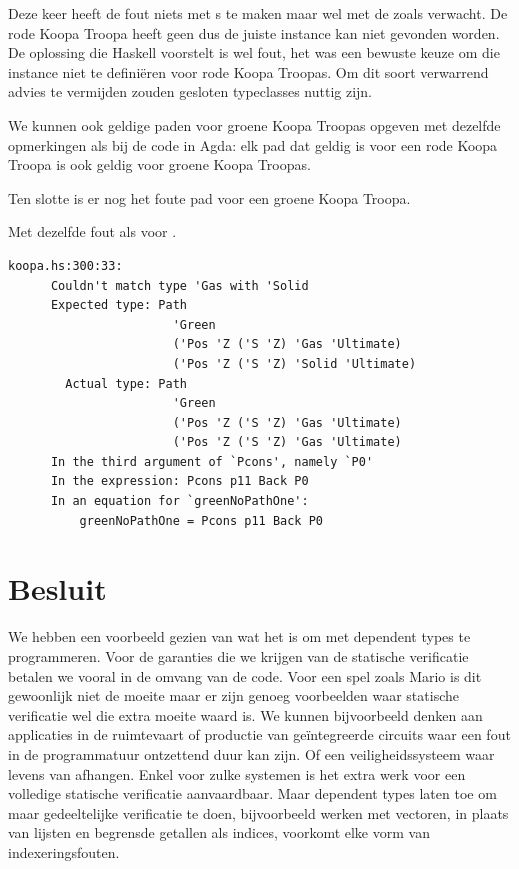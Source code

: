 Deze keer heeft de fout niets met s te maken maar wel met de
 zoals verwacht. De rode Koopa Troopa heeft geen
  dus de juiste instance kan niet gevonden worden.
De oplossing die Haskell voorstelt is wel fout, het was een bewuste keuze om
die instance niet te definiëren voor rode Koopa Troopas. Om dit soort
verwarrend advies te vermijden zouden gesloten typeclasses nuttig zijn.

We kunnen ook geldige paden voor groene Koopa Troopas opgeven met dezelfde
opmerkingen als bij de code in Agda: elk pad dat geldig is voor een rode Koopa
Troopa is ook geldig voor groene Koopa Troopas.


Ten slotte is er nog het foute pad voor een groene Koopa Troopa.


Met dezelfde fout als voor .

\begin{Verbatim}[fontsize=\small]
  koopa.hs:300:33:
      Couldn't match type 'Gas with 'Solid
      Expected type: Path
                       'Green
                       ('Pos 'Z ('S 'Z) 'Gas 'Ultimate)
                       ('Pos 'Z ('S 'Z) 'Solid 'Ultimate)
        Actual type: Path
                       'Green
                       ('Pos 'Z ('S 'Z) 'Gas 'Ultimate)
                       ('Pos 'Z ('S 'Z) 'Gas 'Ultimate)
      In the third argument of `Pcons', namely `P0'
      In the expression: Pcons p11 Back P0
      In an equation for `greenNoPathOne':
          greenNoPathOne = Pcons p11 Back P0
\end{Verbatim}


\section{Besluit}

We hebben een voorbeeld gezien van wat het is om met dependent types te
programmeren. Voor de garanties die we krijgen van de statische verificatie
betalen we vooral in de omvang van de code. Voor een spel zoals Mario is dit
gewoonlijk niet de moeite maar er zijn genoeg voorbeelden waar statische
verificatie wel die extra moeite waard is. We kunnen bijvoorbeeld  denken aan
applicaties in de ruimtevaart of productie van geïntegreerde circuits
waar een fout in de programmatuur ontzettend duur kan zijn. Of een
veiligheidssysteem waar levens van afhangen. Enkel voor zulke systemen is het
extra werk voor een volledige statische verificatie aanvaardbaar. Maar
dependent types laten toe om maar gedeeltelijke verificatie te doen,
bijvoorbeeld werken met vectoren, in plaats van lijsten en begrensde getallen
als indices, voorkomt elke vorm van indexeringsfouten.

